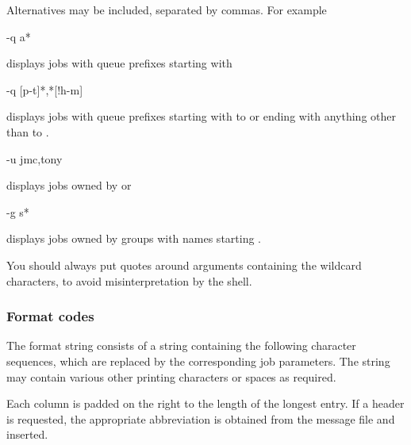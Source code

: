 Alternatives may be included, separated by commas. For example

\begin{expara}

{}-q {\textquotesingle}a*{\textquotesingle}

\end{expara}

displays jobs with queue prefixes starting with 

\begin{expara}

{}-q {\textquotesingle}[p-t]*,*[!h-m]{\textquotesingle}

\end{expara}

displays jobs with queue prefixes starting with  to  or ending with anything other than
 to .

\begin{expara}

{}-u jmc,tony

\end{expara}

displays jobs owned by  or 

\begin{expara}

{}-g {\textquotesingle}s*{\textquotesingle}

\end{expara}

displays jobs owned by groups with names starting .

You should always put quotes around arguments containing the wildcard characters, to avoid misinterpretation by the shell.

\subsubsection{Format codes}

The format string consists of a string containing the following character sequences, which are replaced by the corresponding job
parameters. The string may contain various other printing characters or spaces as required.

Each column is padded on the right to the length of the longest entry. If a header is requested, the appropriate abbreviation is obtained from
the message file and inserted.


